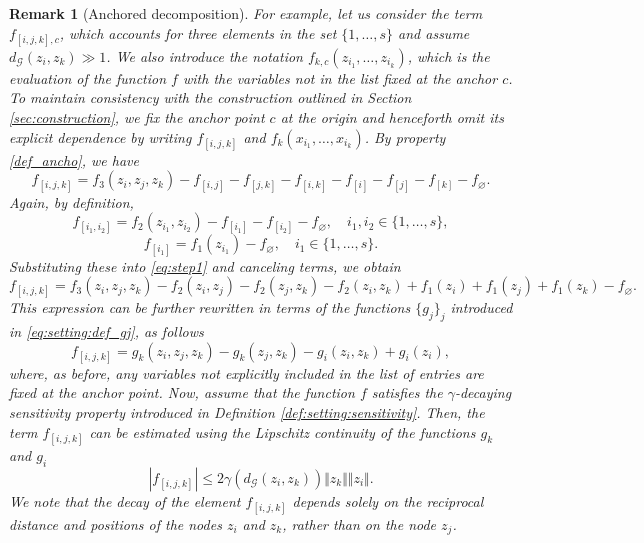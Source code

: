 \documentclass{article}
\newtheorem{remark}{Remark}[section]
\begin{document}
\begin{remark}[Anchored decomposition]
For example, let us consider the term $f_{[i,j,k],c}$, which accounts for three elements in the set $\{1,\ldots,s\}$ and assume $d_{\mathcal G}(z_i,z_k) \gg 1$.
We also introduce the notation $f_{k,c}(z_{i_1},\ldots,z_{i_k})$, which is the evaluation of the function $f$ with the variables not in the list fixed at the anchor $c$.
To maintain consistency with the construction outlined in Section \ref{sec:construction}, we fix the anchor point $c$ at the origin and henceforth omit its explicit dependence by writing $f_{[i,j,k]}$ and $f_{k}(x_{i_1},\ldots,x_{i_k})$.
By property \eqref{def_ancho}, we have
\begin{equation}
f_{[i,j,k]} = f_3(z_i,z_j,z_k)-f_{[i,j]} -f_{[j,k]}-f_{[i,k]}-f_{[i]}-f_{[j]}-f_{[k]}-f_{\varnothing}.
\label{eq:step1}
\end{equation}
Again, by definition,
$$
f_{[i_1,i_2]}= f_2(z_{i_1},z_{i_2})- f_{[i_1]}-f_{[i_2]}-f_{\varnothing}, \quad i_1,i_2 \in \{1,\ldots,s\},
$$
$$
f_{[i_1]} = f_1(z_{i_1}) -f_{\varnothing},\quad i_1 \in \{1,\ldots,s\}.
$$
Substituting these into \eqref{eq:step1} and canceling terms, we obtain
$$
f_{[i,j,k]} = f_3(z_i,z_j,z_k)-f_2(z_i,z_j)-f_2(z_j,z_k)-f_2(z_i,z_k)+f_1(z_i)+f_1(z_j)+f_1(z_k)-f_{\varnothing}.
$$
This expression can be further  rewritten in terms of the functions $\{g_j\}_j$ introduced in \eqref{eq:setting:def_gj}, as follows
$$
f_{[i,j,k]} = g_k(z_i,z_j,z_k)-g_k(z_j,z_k)-g_i(z_i,z_k)+g_i(z_i),
$$
where, as before, any variables not explicitly included in the list of entries are fixed at the anchor point.
Now, assume that the function $f$ satisfies the $\gamma$-decaying sensitivity property introduced in Definition \ref{def:setting:sensitivity}. Then, the term $f_{[i,j,k]}$ can be estimated using the Lipschitz continuity of the functions $g_k$ and $g_i$
$$
|f_{[i,j,k]}| \le 2 \gamma(d_{\mathcal G}(z_i,z_k)) \Vert z_k \Vert \Vert z_i \Vert.
$$
We note that the decay of the element $f_{[i,j,k]}$ depends solely on the reciprocal distance and positions of the nodes $z_i$ and $z_k$, rather than on the node $z_j$. 


\end{remark}
\end{document}
